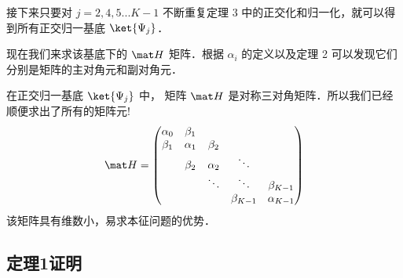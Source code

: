 接下来只要对 $j = 2,4,5...K - 1$ 不断重复定理 3 中的正交化和归一化，就可以得到所有正交归一基底 $\ket{\Psi_j} $．

现在我们来求该基底下的 $\mat H$ 矩阵．根据 $\alpha_i$ 的定义以及定理 2 可以发现它们分别是矩阵的主对角元和副对角元．

{\noindent {}}
在正交归一基底 $\ket{\Psi_j}$ 中， 矩阵 $\mat H$ 是对称三对角矩阵．所以我们已经顺便求出了所有的矩阵元!
\begin{equation}
\mat H =
\begin{pmatrix}
\alpha_0 & \beta_1 &&& \\ 
\beta_1 & \alpha_1 & \beta_2 && \\ 
 & \beta_2 & \alpha_2 & \ddots&  \\ 
& & \ddots& \ddots & {\beta_{K - 1}} \\
&&&\beta_{K - 1} &{\alpha_{K - 1}}
\end{pmatrix}\end{equation}
该矩阵具有维数小，易求本征问题的优势．


\subsection{定理1证明}

